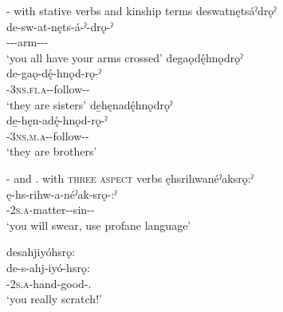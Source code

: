 \ea\label{ex:distrex5}  {\distributive}-{\stative} with stative verbs and kinship terms
\ea deswatnętsáˀdrǫˀ\\
\gll de-sw-at-nęts-á-ˀ-drǫ-ˀ\\
 {\dualic}--{\semireflexive}-arm-{\joinerA}-{\nsf}-\exsc{\distributive-\stative}\\
\glt `you all have your arms crossed'
\ex degaǫdę́hnǫdrǫˀ\\
\gll de-gaǫ-dę́-hnǫd-rǫ-ˀ\\
 {\dualic}-\textsc{3ns.fi.a}-{\semireflexive}-follow-{\distributive-\stative}\\
\glt `they are sisters'
\ex de̱hęnadę́hnǫdrǫˀ\\
\gll de̱-hęn-adę́-hnǫd-rǫ-ˀ\\
 {\dualic}-\textsc{3ns.m.a}-{\semireflexive}-follow-{\distributive-\stative}\\
\glt `they are brothers'
\z
\z

\ea\label{ex:distrex6}  {\distributive}-{\punctual} and  {\distributive}.{\noaspect} with \textsc{three aspect} verbs
\ea ęhsrihwanéˀaksrǫ:ˀ\\
\gll ę-hs-rihw-a-néˀak-srǫ-:ˀ\\
\fut-\textsc{2s.a}-matter-{\joinerA}-sin-{\distributive}-{\punctual}\\
\glt ‘you will swear, use profane language'


\newpage
\ex desahjiyóhsrǫ:\\
\gll de-s-ahj-iyó-hsrǫ:\\
 {\dualic}-\textsc{2s.a}-hand-good-{\distributive}.{\noaspect}\\
\glt `you really scratch!'

\z
\z

